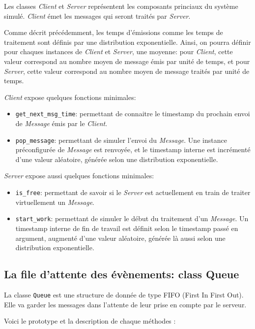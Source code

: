 \documentclass[11pt,a4paper]{article}
\begin{document}
Les classes \emph{Client} et \emph{Server} représentent les composants princiaux du système simulé. \emph{Client} émet les messages qui seront traités par \emph{Server}.

Comme décrit précédemment, les temps d'émissions comme les temps de traitement sont définis par une distribution exponentielle. Ainsi, on pourra définir pour chaques instances de \emph{Client} et \emph{Server}, une moyenne: pour \emph{Client}, cette valeur correspond au nombre moyen de message émis par unité de temps, et pour \emph{Server}, cette valeur correspond au nombre moyen de message traités par unité de temps.

\emph{Client} expose quelques fonctions minimales:
\begin{itemize}
    \item \lstinline|get_next_msg_time|: permettant de connaitre le timestamp du prochain envoi de \emph{Message} émis par le \emph{Client}.
    \item \lstinline|pop_message|: permettant de simuler l'envoi du \emph{Message}. Une instance préconfigurée de \emph{Message} est renvoyée, et le timestamp interne est incrémenté d'une valeur aléatoire, générée selon une distribution exponentielle.
\end{itemize}
\bigskip
\emph{Server} expose aussi quelques fonctions minimales:
\begin{itemize}
    \item \lstinline|is_free|: permettant de savoir si le \emph{Server} est actuellement en train de traiter virtuellement un \emph{Message}.
    \item \lstinline|start_work|: permettant de simuler le début du traitement d'un \emph{Message}. Un timestamp interne de fin de travail est définit selon le timestamp passé en argument, augmenté d'une valeur aléatoire, générée là aussi selon une distribution exponentielle.
\end{itemize}

\bigskip

\subsection{La file d'attente des évènements: class Queue}

La classe \lstinline|Queue| est une structure de donnée de type FIFO (First In First Out). Elle va garder les messages dans l'attente de leur prise en compte par le serveur.

Voici le prototype et la description de chaque méthodes :
\end{document}
